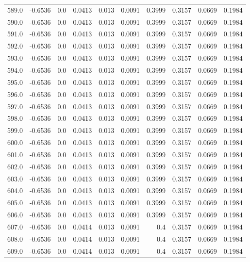 \begin{longtable}{lrrrrrrrrr}
589.0 & -0.6536 & 0.0 & 0.0413 & 0.013 & 0.0091 & 0.3999 & 0.3157 & 0.0669 & 0.1984 \\
590.0 & -0.6536 & 0.0 & 0.0413 & 0.013 & 0.0091 & 0.3999 & 0.3157 & 0.0669 & 0.1984 \\
591.0 & -0.6536 & 0.0 & 0.0413 & 0.013 & 0.0091 & 0.3999 & 0.3157 & 0.0669 & 0.1984 \\
592.0 & -0.6536 & 0.0 & 0.0413 & 0.013 & 0.0091 & 0.3999 & 0.3157 & 0.0669 & 0.1984 \\
593.0 & -0.6536 & 0.0 & 0.0413 & 0.013 & 0.0091 & 0.3999 & 0.3157 & 0.0669 & 0.1984 \\
594.0 & -0.6536 & 0.0 & 0.0413 & 0.013 & 0.0091 & 0.3999 & 0.3157 & 0.0669 & 0.1984 \\
595.0 & -0.6536 & 0.0 & 0.0413 & 0.013 & 0.0091 & 0.3999 & 0.3157 & 0.0669 & 0.1984 \\
596.0 & -0.6536 & 0.0 & 0.0413 & 0.013 & 0.0091 & 0.3999 & 0.3157 & 0.0669 & 0.1984 \\
597.0 & -0.6536 & 0.0 & 0.0413 & 0.013 & 0.0091 & 0.3999 & 0.3157 & 0.0669 & 0.1984 \\
598.0 & -0.6536 & 0.0 & 0.0413 & 0.013 & 0.0091 & 0.3999 & 0.3157 & 0.0669 & 0.1984 \\
599.0 & -0.6536 & 0.0 & 0.0413 & 0.013 & 0.0091 & 0.3999 & 0.3157 & 0.0669 & 0.1984 \\
600.0 & -0.6536 & 0.0 & 0.0413 & 0.013 & 0.0091 & 0.3999 & 0.3157 & 0.0669 & 0.1984 \\
601.0 & -0.6536 & 0.0 & 0.0413 & 0.013 & 0.0091 & 0.3999 & 0.3157 & 0.0669 & 0.1984 \\
602.0 & -0.6536 & 0.0 & 0.0413 & 0.013 & 0.0091 & 0.3999 & 0.3157 & 0.0669 & 0.1984 \\
603.0 & -0.6536 & 0.0 & 0.0413 & 0.013 & 0.0091 & 0.3999 & 0.3157 & 0.0669 & 0.1984 \\
604.0 & -0.6536 & 0.0 & 0.0413 & 0.013 & 0.0091 & 0.3999 & 0.3157 & 0.0669 & 0.1984 \\
605.0 & -0.6536 & 0.0 & 0.0413 & 0.013 & 0.0091 & 0.3999 & 0.3157 & 0.0669 & 0.1984 \\
606.0 & -0.6536 & 0.0 & 0.0413 & 0.013 & 0.0091 & 0.3999 & 0.3157 & 0.0669 & 0.1984 \\
607.0 & -0.6536 & 0.0 & 0.0414 & 0.013 & 0.0091 & 0.4 & 0.3157 & 0.0669 & 0.1984 \\
608.0 & -0.6536 & 0.0 & 0.0414 & 0.013 & 0.0091 & 0.4 & 0.3157 & 0.0669 & 0.1984 \\
609.0 & -0.6536 & 0.0 & 0.0414 & 0.013 & 0.0091 & 0.4 & 0.3157 & 0.0669 & 0.1984 \\

\end{longtable}
